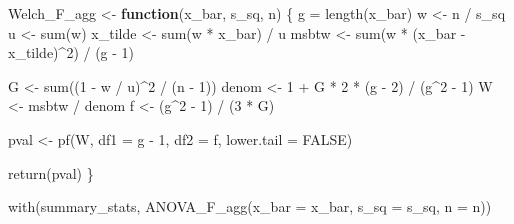 \documentclass[
]{book}
\newenvironment{Shaded}{\begin{snugshade}}{\end{snugshade}}
\newcommand{\AttributeTok}[1]{\textcolor[rgb]{0.77,0.63,0.00}{#1}}
\newcommand{\ConstantTok}[1]{\textcolor[rgb]{0.00,0.00,0.00}{#1}}
\newcommand{\ControlFlowTok}[1]{\textcolor[rgb]{0.13,0.29,0.53}{\textbf{#1}}}
\newcommand{\DecValTok}[1]{\textcolor[rgb]{0.00,0.00,0.81}{#1}}
\newcommand{\FunctionTok}[1]{\textcolor[rgb]{0.00,0.00,0.00}{#1}}
\newcommand{\NormalTok}[1]{#1}
\newcommand{\OtherTok}[1]{\textcolor[rgb]{0.56,0.35,0.01}{#1}}
\newcommand{\SpecialCharTok}[1]{\textcolor[rgb]{0.00,0.00,0.00}{#1}}
\begin{document}
\begin{Shaded}
\begin{Highlighting}[]
\NormalTok{Welch\_F\_agg }\OtherTok{\textless{}{-}} \ControlFlowTok{function}\NormalTok{(x\_bar, s\_sq, n) \{}
\NormalTok{  g }\OtherTok{=} \FunctionTok{length}\NormalTok{(x\_bar)}
\NormalTok{  w }\OtherTok{\textless{}{-}}\NormalTok{ n }\SpecialCharTok{/}\NormalTok{ s\_sq}
\NormalTok{  u }\OtherTok{\textless{}{-}} \FunctionTok{sum}\NormalTok{(w)}
\NormalTok{  x\_tilde }\OtherTok{\textless{}{-}} \FunctionTok{sum}\NormalTok{(w }\SpecialCharTok{*}\NormalTok{ x\_bar) }\SpecialCharTok{/}\NormalTok{ u}
\NormalTok{  msbtw }\OtherTok{\textless{}{-}} \FunctionTok{sum}\NormalTok{(w }\SpecialCharTok{*}\NormalTok{ (x\_bar }\SpecialCharTok{{-}}\NormalTok{ x\_tilde)}\SpecialCharTok{\^{}}\DecValTok{2}\NormalTok{) }\SpecialCharTok{/}\NormalTok{ (g }\SpecialCharTok{{-}} \DecValTok{1}\NormalTok{)}

\NormalTok{  G }\OtherTok{\textless{}{-}} \FunctionTok{sum}\NormalTok{((}\DecValTok{1} \SpecialCharTok{{-}}\NormalTok{ w }\SpecialCharTok{/}\NormalTok{ u)}\SpecialCharTok{\^{}}\DecValTok{2} \SpecialCharTok{/}\NormalTok{ (n }\SpecialCharTok{{-}} \DecValTok{1}\NormalTok{))}
\NormalTok{  denom }\OtherTok{\textless{}{-}} \DecValTok{1} \SpecialCharTok{+}\NormalTok{  G }\SpecialCharTok{*} \DecValTok{2} \SpecialCharTok{*}\NormalTok{ (g }\SpecialCharTok{{-}} \DecValTok{2}\NormalTok{) }\SpecialCharTok{/}\NormalTok{ (g}\SpecialCharTok{\^{}}\DecValTok{2} \SpecialCharTok{{-}} \DecValTok{1}\NormalTok{)}
\NormalTok{  W }\OtherTok{\textless{}{-}}\NormalTok{ msbtw }\SpecialCharTok{/}\NormalTok{ denom}
\NormalTok{  f }\OtherTok{\textless{}{-}}\NormalTok{ (g}\SpecialCharTok{\^{}}\DecValTok{2} \SpecialCharTok{{-}} \DecValTok{1}\NormalTok{) }\SpecialCharTok{/}\NormalTok{ (}\DecValTok{3} \SpecialCharTok{*}\NormalTok{ G)}

\NormalTok{  pval }\OtherTok{\textless{}{-}} \FunctionTok{pf}\NormalTok{(W, }\AttributeTok{df1 =}\NormalTok{ g }\SpecialCharTok{{-}} \DecValTok{1}\NormalTok{, }\AttributeTok{df2 =}\NormalTok{ f, }\AttributeTok{lower.tail =} \ConstantTok{FALSE}\NormalTok{)}

  \FunctionTok{return}\NormalTok{(pval)}
\NormalTok{\}}

\FunctionTok{with}\NormalTok{(summary\_stats, }\FunctionTok{ANOVA\_F\_agg}\NormalTok{(}\AttributeTok{x\_bar =}\NormalTok{ x\_bar, }\AttributeTok{s\_sq =}\NormalTok{ s\_sq, }\AttributeTok{n =}\NormalTok{ n))}
\end{Highlighting}
\end{Shaded}
\end{document}

